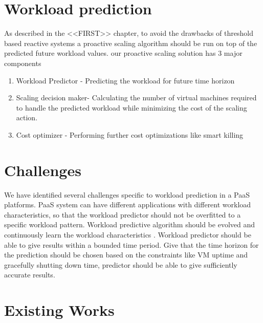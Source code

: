 \usepackage{multirow}

\section{Workload prediction}


As described in the <<FIRST>> chapter, to avoid the drawbacks of threshold based reactive systems a proactive scaling algorithm should be run on top of the predicted future workload values. our proactive scaling solution has 3 major components
\begin{enumerate}
\item Workload Predictor - Predicting the workload for future time horizon
\item Scaling decision maker- Calculating the number of virtual machines required to handle the predicted workload while minimizing the cost of the scaling action.
\item Cost optimizer - Performing further cost optimizations like smart killing
\end{enumerate}

\section{Challenges}

We have identified several challenges specific to workload prediction in a PaaS platforms.
PaaS system can have different applications with different workload characteristics, so that the workload predictor should not be overfitted to a specific workload pattern.
Workload predictive algorithm should be evolved and continuously learn the workload characteristics . 
Workload predictor should be able to give results within a bounded time period.
Give that the  time horizon for the prediction should be chosen based on the constraints like VM uptime and gracefully shutting down time, predictor should be able to give sufficiently accurate results.

\section{Existing Works}


